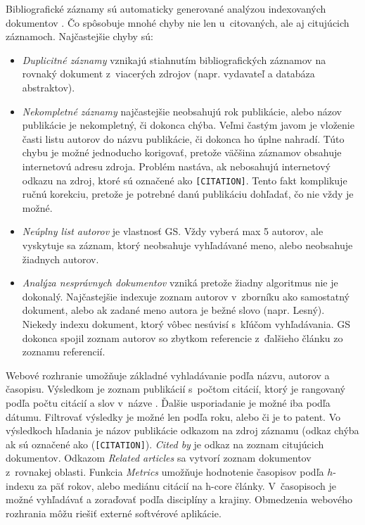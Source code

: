 Bibliografické záznamy sú automaticky generované analýzou indexovaných
dokumentov \citep{Vine2006}. Čo spôsobuje mnohé chyby nie len u~citovaných, ale
aj citujúcich záznamoch. Najčastejšie chyby sú:
\begin{itemize}
  \item \emph{Duplicitné záznamy} vznikajú stiahnutím bibliografických záznamov
    na rovnaký dokument z~viacerých zdrojov (napr. vydavateľ a databáza abstraktov).
  \item \emph{Nekompletné záznamy} najčastejšie neobsahujú rok publikácie,
    alebo názov publikácie je nekompletný, či dokonca chýba.  Veľmi častým
    javom je vloženie časti listu autorov do názvu publikácie, či dokonca ho
    úplne nahradí.  Túto chybu je možné jednoducho korigovať, pretože väčšina
    záznamov obsahuje internetovú adresu zdroja. Problém nastáva, ak nebosahujú
    internetový odkazu na zdroj, ktoré sú označené ako \texttt{[CITATION]}.
    Tento fakt komplikuje ručnú korekciu, pretože je potrebné danú publikáciu
    dohľadať, čo nie vždy je možné.
  \item \emph{Neúplny list autorov} je vlastnosť GS. Vždy vyberá max 5 autorov,
    ale vyskytuje sa záznam, ktorý neobsahuje vyhľadávané meno, alebo neobsahuje
    žiadnych autorov.
  \item \emph{Analýza nesprávnych dokumentov} vzniká pretože žiadny algoritmus nie je
    dokonalý.  Najčastejšie indexuje zoznam autorov v~zborníku ako samostatný
    dokument, alebo ak zadané meno autora je bežné slovo (napr. Lesný).  Niekedy
    indexu dokument, ktorý vôbec nesúvisí s~kľúčom vyhľadávania.
    GS dokonca spojil zoznam autorov so zbytkom referencie z~ďalšieho článku zo
    zoznamu referencií.
\end{itemize}

\noindent Webové rozhranie umožňuje základné vyhladávanie podľa názvu, autorov a
časopisu.  Výsledkom je zoznam publikácií s~počtom citácií, ktorý je rangovaný
podľa počtu citácií a slov v~názve \citep{Beel2009}.  Ďalšie usporiadanie je
možné iba podľa dátumu.  Filtrovať výsledky je možné len podľa roku, alebo či
je to patent.  Vo výsledkoch hľadania je názov publikácie odkazom na zdroj
záznamu (odkaz chýba ak sú označené ako (\texttt{[CITATION]}). \emph{Cited by}
je odkaz na zoznam citujúcich dokumentov.  Odkazom \emph{Related articles} sa
vytvorí zoznam dokumentov z~rovnakej oblasti.  Funkcia \emph{Metrics} umožňuje
hodnotenie časopisov podľa $h$-indexu za päť rokov, alebo mediánu citácií na
h-core články. V~časopisoch je možné vyhľadávať a zoraďovať podľa disciplíny a
krajiny.  Obmedzenia webového rozhrania môžu riešiť externé softvérové aplikácie.

